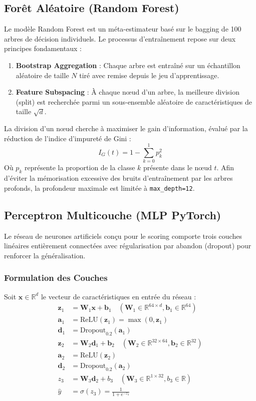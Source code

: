 \documentclass[12pt,a4paper]{article}
\begin{document}
\subsection{Forêt Aléatoire (Random Forest)}
Le modèle Random Forest est un méta-estimateur basé sur le bagging de 100 arbres de décision individuels. Le processus d'entraînement repose sur deux principes fondamentaux :
\begin{enumerate}
    \item \textbf{Bootstrap Aggregation} : Chaque arbre est entraîné sur un échantillon aléatoire de taille $N$ tiré avec remise depuis le jeu d'apprentissage.
    \item \textbf{Feature Subspacing} : À chaque nœud d'un arbre, la meilleure division (split) est recherchée parmi un sous-ensemble aléatoire de caractéristiques de taille $\sqrt{d}$.
\end{enumerate}
La division d'un nœud cherche à maximiser le gain d'information, évalué par la réduction de l'indice d'impureté de Gini :
\begin{equation}
    I_G(t) = 1 - \sum_{k=0}^{1} p_k^2
\end{equation}
Où $p_k$ représente la proportion de la classe $k$ présente dans le nœud $t$. Afin d'éviter la mémorisation excessive des bruits d'entraînement par les arbres profonds, la profondeur maximale est limitée à \texttt{max\_depth=12}.

\subsection{Perceptron Multicouche (MLP PyTorch)}
Le réseau de neurones artificiels conçu pour le scoring comporte trois couches linéaires entièrement connectées avec régularisation par abandon (dropout) pour renforcer la généralisation.

\subsubsection{Formulation des Couches}
Soit $\mathbf{x} \in \mathbb{R}^{d}$ le vecteur de caractéristiques en entrée du réseau :
\begin{align}
    \mathbf{z}_1 &= \mathbf{W}_1 \mathbf{x} + \mathbf{b}_1 \quad (\mathbf{W}_1 \in \mathbb{R}^{64 \times d}, \mathbf{b}_1 \in \mathbb{R}^{64}) \\
    \mathbf{a}_1 &= \text{ReLU}(\mathbf{z}_1) = \max(0, \mathbf{z}_1) \\
    \mathbf{d}_1 &= \text{Dropout}_{0.2}(\mathbf{a}_1) \\
    \mathbf{z}_2 &= \mathbf{W}_2 \mathbf{d}_1 + \mathbf{b}_2 \quad (\mathbf{W}_2 \in \mathbb{R}^{32 \times 64}, \mathbf{b}_2 \in \mathbb{R}^{32}) \\
    \mathbf{a}_2 &= \text{ReLU}(\mathbf{z}_2) \\
    \mathbf{d}_2 &= \text{Dropout}_{0.2}(\mathbf{a}_2) \\
    z_3 &= \mathbf{W}_3 \mathbf{d}_2 + b_3 \quad (\mathbf{W}_3 \in \mathbb{R}^{1 \times 32}, b_3 \in \mathbb{R}) \\
    \hat{y} &= \sigma(z_3) = \frac{1}{1 + e^{-z_3}}
\end{align}
\end{document}
